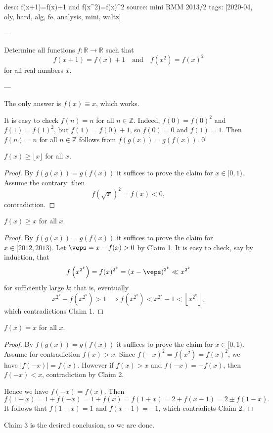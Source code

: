 desc: f(x+1)=f(x)+1 and f(x^2)=f(x)^2
source: mini RMM 2013/2
tags: [2020-04, oly, hard, alg, fe, analysis, mini, waltz]

---

Determine all functions $f:\mathbb R\to\mathbb R$ such that \[f(x+1)=f(x)+1\quad\text{and}\quad f\left(x^2\right)=f(x)^2\]
for all real numbers $x$.

---

The only answer is $f(x)\equiv x$, which works.

It is easy to check $f(n)=n$ for all $n\in\mathbb Z$. Indeed, $f(0)=f(0)^2$ and $f(1)=f(1)^2$, but $f(1)=f(0)+1$, so $f(0)=0$ and $f(1)=1$. Then $f(n)=n$ for all $n\in\mathbb Z$ follows from $f(g(x))=g(f(x))$.
\setcounter{claim}0
\begin{claim}
    $f(x)\ge\lfloor x\rfloor$ for all $x$.
\end{claim}
\begin{proof}
    By $f(g(x))=g(f(x))$ it suffices to prove the claim for $x\in[0,1)$. Assume the contrary: then \[f\left(\sqrt x\right)^2=f(x)<0,\]
    contradiction.
\end{proof}
\begin{claim}
    $f(x)\ge x$ for all $x$.
\end{claim}
\begin{proof}
    By $f(g(x))=g(f(x))$ it suffices to prove the claim for $x\in[2012,2013)$. Let $\veps=x-f(x)>0$ by Claim 1. It is easy to check, say by induction, that \[f\left(x^{2^k}\right)=f(x)^{2^k}=(x-\veps)^{2^k}\ll x^{2^k}\]
    for sufficiently large $k$; that is, eventually \[x^{2^k}-f\left(x^{2^k}\right)>1\implies f\left(x^{2^k}\right)<x^{2^k}-1<\left\lfloor x^{2^k}\right\rfloor,\]
    which contradictions Claim 1.
\end{proof}
\begin{claim}
    $f(x)=x$ for all $x$.
\end{claim}
\begin{proof}
    By $f(g(x))=g(f(x))$ it suffices to prove the claim for $x\in[0,1)$. Assume for contradiction $f(x)>x$. Since $f(-x)^2=f(x^2)=f(x)^2$, we have $|f(-x)|=f(x)$. However if $f(x)>x$ and $f(-x)=-f(x)$, then $f(-x)<x$, contradiction by Claim 2.

    Hence we have $f(-x)=f(x)$. Then \[f(1-x)=1+f(-x)=1+f(x)=f(1+x)=2+f(x-1)=2\pm f(1-x).\]
    It follows that $f(1-x)=1$ and $f(x-1)=-1$, which contradicts Claim 2.
\end{proof}

Claim 3 is the desired conclusion, so we are done.

